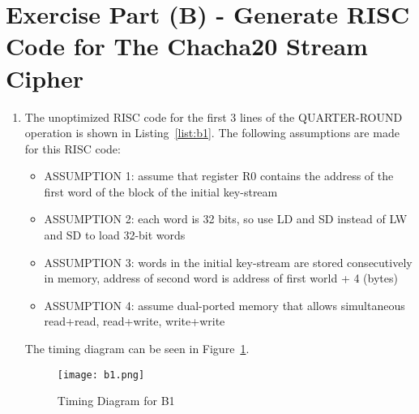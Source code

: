\section*{Exercise Part (B) - Generate RISC Code for The Chacha20 Stream Cipher}

\begin{enumerate}[wide, label=(B\arabic*)]

\item The unoptimized RISC code for the first 3 lines of the QUARTER-ROUND operation is shown in Listing~\ref{list:b1}. The following assumptions are made for this RISC code:
\begin{itemize}
	\item ASSUMPTION 1: assume that register R0 contains the address of the first word of the block of the initial key-stream
	\item ASSUMPTION 2: each word is 32 bits, so use LD and SD instead of LW and SD to load 32-bit words
	\item ASSUMPTION 3: words in the initial key-stream are stored consecutively in memory, address of second word is address of first world + 4 (bytes)
	\item ASSUMPTION 4: assume dual-ported memory that allows simultaneous read+read, read+write, write+write
\end{itemize}

The timing diagram can be seen in Figure~\ref{fig:B1}.
\begin{figure}[htp]
	\centering
	\texttt{[image: b1.png]}
	\caption{\label{fig:B1}Timing Diagram for B1}
\end{figure}


\end{enumerate}
